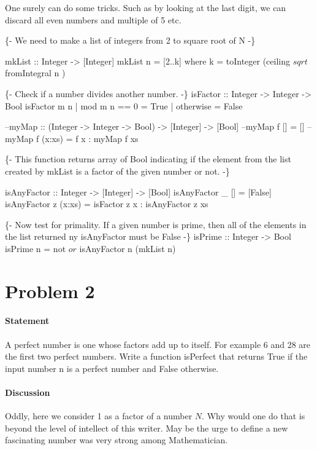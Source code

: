 \documentclass{article}%
\begin{document}
One surely can do some tricks. Such as by looking at the last digit,
we can discard all even numbers and multiple of 5 etc.

\nwenddocs{}\endmoddef\nwstartdeflinemarkup\nwenddeflinemarkup
\{- We need to make a list of integers from 2 to square root of N -\}

mkList :: Integer -> [Integer]
mkList n = [2..k] 
    where k = toInteger (ceiling $ sqrt $ fromIntegral n )

\{- Check if a number divides another number. -\}
isFactor :: Integer -> Integer -> Bool
isFactor m n | mod m n == 0 = True
             | otherwise = False

--myMap :: (Integer -> Integer -> Bool) ->  [Integer] -> [Bool]
--myMap f  [] = []
--myMap f  (x:xs) = f x : myMap f xs

\{- This function returns array of Bool indicating if the element from
the list created by mkList is a factor of the given number or not. -\}

isAnyFactor :: Integer -> [Integer] -> [Bool]
isAnyFactor _ [] = [False]
isAnyFactor z (x:xs) = isFactor z x : isAnyFactor z xs


\{- Now test for primality. If a given number is prime, then all of the
elements in the list returned ny isAnyFactor must be False -\}
isPrime :: Integer -> Bool
isPrime n = not $ or $ isAnyFactor n (mkList n)

\nwendcode{}\nwdocspar

\section{Problem 2}
\paragraph{Statement}
A  perfect  number  is  one  whose  factors  add  up  to  itself.
For example 6 and 28 are the  first two perfect numbers.  Write a function
isPerfect that returns True if the input number n is a perfect  number
and False otherwise. 

\paragraph{Discussion}
    
    Oddly, here we consider 1 as a factor of a number $N$. Why would one
    do that is beyond the level of intellect of this writer. May be the
    urge to define a new fascinating number was very strong among
    Mathematician.
\end{document}
